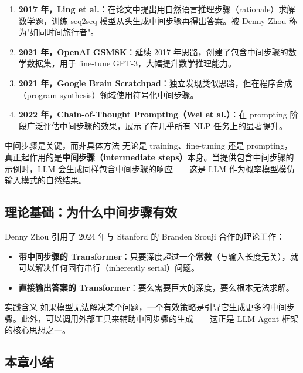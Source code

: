 \documentclass[a4paper]{article}
\begin{document}
\begin{enumerate}
    \item \textbf{2017 年，Ling et al.}：在论文中提出用自然语言推理步骤（rationale）求解数学题，训练 seq2seq 模型从头生成中间步骤再得出答案。被 Denny Zhou 称为"如同时间旅行者"。
    \item \textbf{2021 年，OpenAI GSM8K}：延续 2017 年思路，创建了包含中间步骤的数学数据集，用于 fine-tune GPT-3，大幅提升数学推理能力。
    \item \textbf{2021 年，Google Brain Scratchpad}：独立发现类似思路，但在程序合成（program synthesis）领域使用符号化中间步骤。
    \item \textbf{2022 年，Chain-of-Thought Prompting（Wei et al.）}：在 prompting 阶段广泛评估中间步骤的效果，展示了在几乎所有 NLP 任务上的显著提升。
\end{enumerate}

\begin{importantbox}{中间步骤是关键，而非具体方法}
无论是 training、fine-tuning 还是 prompting，真正起作用的是\textbf{中间步骤（intermediate steps）}本身。当提供包含中间步骤的示例时，LLM 会生成同样包含中间步骤的响应——这是 LLM 作为概率模型模仿输入模式的自然结果。
\end{importantbox}

\subsection{理论基础：为什么中间步骤有效}

Denny Zhou 引用了 2024 年与 Stanford 的 Branden Srouji 合作的理论工作：

\begin{itemize}
    \item \textbf{带中间步骤的 Transformer}：只要深度超过一个\textbf{常数}（与输入长度无关），就可以解决任何固有串行（inherently serial）问题。
    \item \textbf{直接输出答案的 Transformer}：要么需要巨大的深度，要么根本无法求解。
\end{itemize}

\begin{warningbox}{实践含义}
如果模型无法解决某个问题，一个有效策略是引导它生成更多的中间步骤。此外，可以调用外部工具来辅助中间步骤的生成——这正是 LLM Agent 框架的核心思想之一。
\end{warningbox}

\subsection{本章小结}
\end{document}
